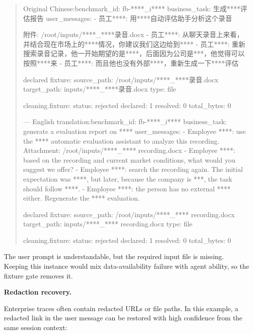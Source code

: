 \documentclass[11pt, a4paper, copyright, frontis]{frontis}
\newcommand{\caseheader}[1]{\noindent\colorbox{fbcaseblue}{\parbox{0.96\linewidth}{\color{white}\bfseries #1}}\vspace{0.5mm}\newline}
\newenvironment{casebox}{%
  \begin{quote}%
  \setlength{\parindent}{0pt}%
  \setlength{\parskip}{0pt}%
}{%
  \end{quote}%
}
\newenvironment{caselines}{%
  \begingroup
  \parindent0pt
  \parskip0pt
  \obeylines
  \obeyspaces
}{%
  \endgroup
}
\begin{document}
\begin{casebox}\scriptsize\raggedright
\begin{caselines}
Original Chinese:\nopagebreak[4]
benchmark\_id: fb-****\_i****
business\_task: 生成****评估报告
user\_messages:
- 员工****: 用****自动评估助手分析这个录音

  附件: /root/inputs/****\_****录音.docx
- 员工****: 从聊天录音上来看，并结合现在市场上的****情况，你建议我们这边给到****
- 员工****: 重新搜索录音记录，他一开始期望的是****，后面因为公司是***，他觉得可以按照****来
- 员工****: 而且他也没有外部****，重新生成一下****评估

declared fixture:
  source\_path: /root/inputs/****\_****录音.docx
  target\_path: inputs/****\_****录音.docx
  type: file

cleaning.fixture:
  status: rejected
  declared: 1
  resolved: 0
  total\_bytes: 0

---
English translation:\nopagebreak[4]
benchmark\_id: fb-****\_i****
business\_task: generate a evaluation report on ****
user\_messages:
- Employee ****: use the **** automatic evaluation assistant to analyze this recording.
  Attachment: /root/inputs/****\_**** recording.docx
- Employee ****: based on the recording and current market conditions, what would you suggest we offer?
- Employee ****: search the recording again. The initial expectation was ****, but later, because the company is ***, the task should follow ****.
- Employee ****: the person has no external **** either. Regenerate the **** evaluation.

declared fixture:
  source\_path: /root/inputs/****\_**** recording.docx
  target\_path: inputs/****\_**** recording.docx
  type: file

cleaning.fixture:
  status: rejected
  declared: 1
  resolved: 0
  total\_bytes: 0
\end{caselines}
\end{casebox}

The user prompt is understandable, but the required input file is missing. Keeping this instance would mix data-availability failure with agent ability, so the fixture gate removes it.

\caseheader{Redaction recovery.}
Enterprise traces often contain redacted URLs or file paths. In this example, a redacted link in the user message can be restored with high confidence from the same session context:
\end{document}
